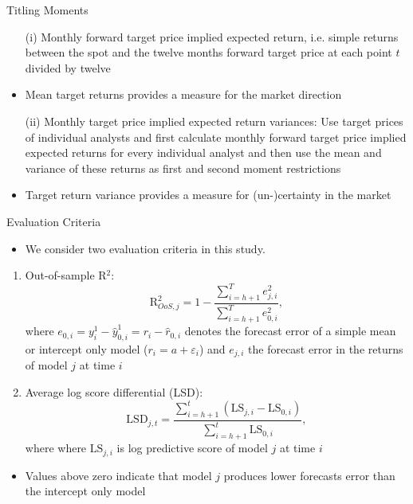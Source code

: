 \documentclass[9pt,xcolor=x11names,compress]{beamer}
\theoremstyle{standard}
\theoremstyle{notes}
\begin{document}
\begin{frame}{Titling Moments}
	\begin{itemize}
		\item[(i)]Monthly forward target price implied expected return, i.e. simple returns between the spot and the twelve months forward target price at each point $t$ divided by twelve
		\item Mean target returns provides a measure for the market direction 
		\pause
		\item[(ii)] Monthly target price implied expected return variances: Use target prices of individual analysts and first calculate monthly forward target price implied expected returns for every individual analyst and then use the mean and variance of these returns as first and second moment restrictions
		\item Target return variance provides a measure for (un-)certainty in the market
	\end{itemize}
\end{frame}

\begin{frame}{Evaluation Criteria}
	\begin{itemize}
		\item We consider two evaluation criteria in this study. 
	\end{itemize}
		
		\begin{enumerate}
			\item Out-of-sample R$^2$:
			\begin{equation}\label{eqn:R2}
			\text{R}^2_{OoS,j}=1-\frac{\sum_{i=h+1}^{T}e_{j,i}^2}{\sum_{i=h+1}^{T}e_{0,i}^2},
			\end{equation}
			where $e_{0,i}=y_i^1-\hat{y}_{0,i}^1=r_i-\hat{r}_{0,i}$ denotes the forecast error of a simple mean or  intercept only model ($r_i=a+\varepsilon_i$) and $e_{j,i}$ the forecast error in the returns of model $j$ at time $i$
			\item Average log score differential (LSD):
			\begin{equation}\label{eqn:LSD}
			\text{LSD}_{j,t}=\frac{\sum_{i=h+1}^{t}\left(\text{LS}_{j,i}-\text{LS}_{0,i}\right)}{\sum_{i=h+1}^{t}\text{LS}_{0,i}},
			\end{equation}
			where where $\text{LS}_{j,i}$ is log predictive score of model $j$ at time $i$
		\end{enumerate}
	
	\begin{itemize}
		\item Values above zero indicate that model $j$ produces lower forecasts error than the intercept only model
	\end{itemize}
\end{frame}
\end{document}
